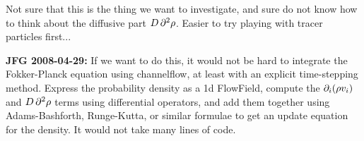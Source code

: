 Not sure that this is the thing we want to investigate, and sure do not know
how to think about the diffusive part $D \, \partial^2 \rho$. Easier to
try playing with tracer particles first...

\noindent
{\bf JFG 2008-04-29:} If we want to do this, it would not be hard to integrate
the Fokker-Planck equation using channelflow, at least with an explicit time-stepping
method. Express the probability density as a 1d FlowField, compute the $\partial_i(\rho v_i)$
and $D \, \partial^2 \rho$ terms using differential operators, and add them together
using Adams-Bashforth, Runge-Kutta, or similar formulae to get an update equation for the
density. It would not take many lines of code.
